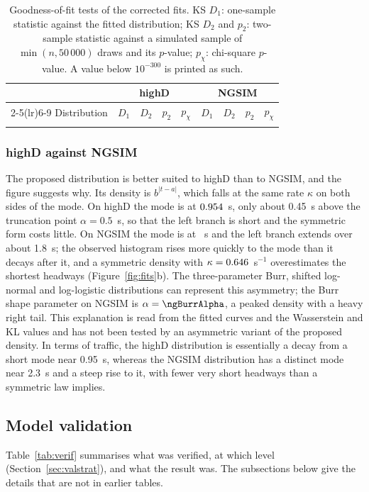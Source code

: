 \documentclass[11pt,a4paper]{article}
\numberwithin{equation}{section}
\begin{document}
\begin{table}[H]
\centering\footnotesize
\setlength{\tabcolsep}{3.5pt}
\caption{Goodness-of-fit tests of the corrected fits. KS $D_1$: one-sample statistic against the fitted distribution; KS $D_2$ and $p_2$: two-sample statistic against a simulated sample of $\min(n,50\,000)$ draws and its $p$-value; $p_\chi$: chi-square $p$-value. A value below $10^{-300}$ is printed as such.}
\label{tab:tests}
\begin{tabular}{@{}lrrrrrrrr@{}}
\toprule
 & \multicolumn{4}{c}{highD} & \multicolumn{4}{c}{NGSIM} \\
\cmidrule(lr){2-5}\cmidrule(lr){6-9}
Distribution & $D_1$ & $D_2$ & $p_2$ & $p_\chi$ & $D_1$ & $D_2$ & $p_2$ & $p_\chi$ \\
\midrule
\\
\bottomrule
\end{tabular}
\end{table}

\subsubsection{highD against NGSIM}\label{sec:disc}
The proposed distribution is better suited to highD than to NGSIM, and the figure suggests why. Its density is $b^{|t-a|}$, which falls at the same rate $\kappa$ on both sides of the mode.
On highD the mode is at $0.954$~s, only about 0.45~s above the truncation point $\alpha=0.5$~s, so that the left branch is short and the symmetric form costs little. On NGSIM the mode is at \ngA~s and the left branch
extends over about 1.8~s; the observed histogram rises more quickly to the mode than it decays after it, and
a symmetric density with $\kappa=0.646$~s$^{-1}$ overestimates the shortest headways (Figure~\ref{fig:fits}b). The three-parameter Burr, shifted log-normal and log-logistic distributions can represent this asymmetry; the Burr shape parameter on NGSIM is $\alpha=\ngBurrAlpha$, a peaked density with a heavy right tail.
This explanation is read from the fitted curves and the Wasserstein and KL values and has not been tested by an asymmetric variant of the proposed density. In terms of traffic, the highD distribution is essentially a decay from a short mode near 0.95~s, whereas the NGSIM distribution has a distinct mode near 2.3~s and a steep rise to it, with fewer very short headways than a symmetric law implies.

\subsection{Model validation}\label{sec:valid}
Table~\ref{tab:verif} summarises what was verified, at which level (Section~\ref{sec:valstrat}), and what the result was. The subsections below give the details that
are not in earlier tables.
\end{document}
